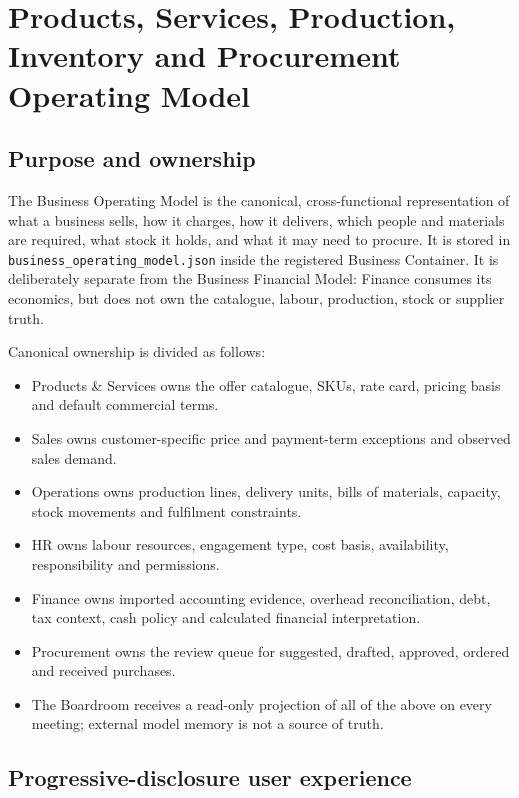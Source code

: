 \section{Products, Services, Production, Inventory and Procurement Operating Model}
\label{sec:aion-operating-model}

\subsection{Purpose and ownership}

The Business Operating Model is the canonical, cross-functional representation of what a business sells, how it charges, how it delivers, which people and materials are required, what stock it holds, and what it may need to procure.  It is stored in \texttt{business\_operating\_model.json} inside the registered Business Container.  It is deliberately separate from the Business Financial Model: Finance consumes its economics, but does not own the catalogue, labour, production, stock or supplier truth.

Canonical ownership is divided as follows:
\begin{itemize}
  \item Products \& Services owns the offer catalogue, SKUs, rate card, pricing basis and default commercial terms.
  \item Sales owns customer-specific price and payment-term exceptions and observed sales demand.
  \item Operations owns production lines, delivery units, bills of materials, capacity, stock movements and fulfilment constraints.
  \item HR owns labour resources, engagement type, cost basis, availability, responsibility and permissions.
  \item Finance owns imported accounting evidence, overhead reconciliation, debt, tax context, cash policy and calculated financial interpretation.
  \item Procurement owns the review queue for suggested, drafted, approved, ordered and received purchases.
  \item The Boardroom receives a read-only projection of all of the above on every meeting; external model memory is not a source of truth.
\end{itemize}

\subsection{Progressive-disclosure user experience}

